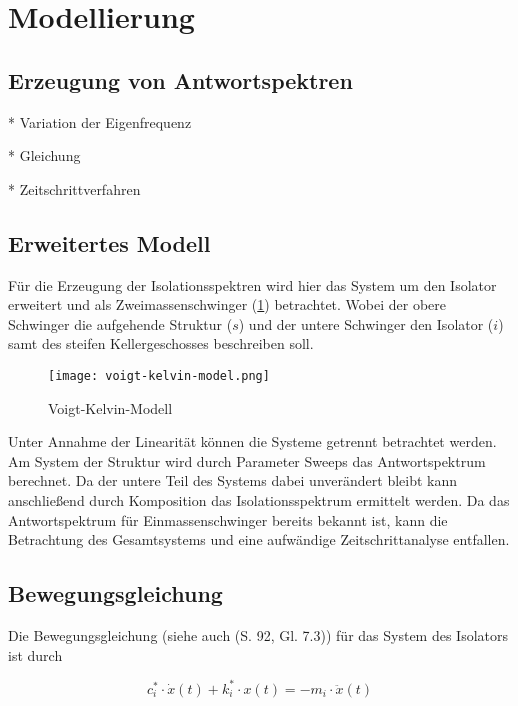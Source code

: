 \section{Modellierung}
\label{sec:modellierung}

\subsection{Erzeugung von Antwortspektren}

* Variation der Eigenfrequenz

* Gleichung

* Zeitschrittverfahren

\subsection{Erweitertes Modell}

Für die Erzeugung der Isolationsspektren wird hier das System um den Isolator erweitert und als Zweimassenschwinger (\cref{fig:vkm}) betrachtet.
Wobei der obere Schwinger die aufgehende Struktur ($s$) und der untere Schwinger den Isolator ($i$) samt des steifen Kellergeschosses beschreiben soll.

\begin{figure}[ht]
    \centering
    \texttt{[image: voigt-kelvin-model.png]}
    \caption{Voigt-Kelvin-Modell}
    \label{fig:vkm}
\end{figure}

Unter Annahme der Linearität können die Systeme getrennt betrachtet werden. Am System der Struktur wird durch Parameter Sweeps das Antwortspektrum berechnet. Da der untere Teil des Systems dabei unverändert bleibt kann anschließend durch Komposition das Isolationsspektrum ermittelt werden.
Da das Antwortspektrum für Einmassenschwinger bereits bekannt ist, kann die Betrachtung des Gesamtsystems und eine aufwändige Zeitschrittanalyse entfallen.

\subsection{Bewegungsgleichung}

Die Bewegungsgleichung (siehe auch \cite{Kramer} (S. 92, Gl. 7.3)) für das System des Isolators ist durch

\begin{equation}\label{eq:bewegungsgleichung}
c_i^* \cdot \dot x(t) + k_i^* \cdot x(t) = - m_i \cdot \ddot x(t)
\end{equation}

